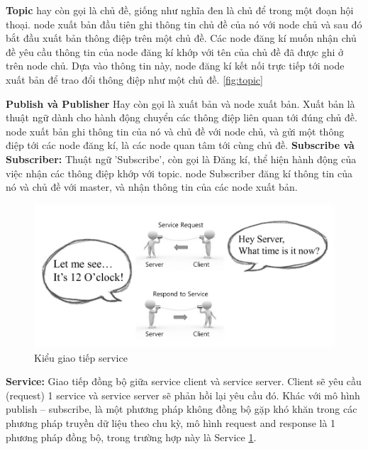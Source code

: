 \textbf{Topic} hay còn gọi là chủ đề, giống như nghĩa đen là chủ để trong một đoạn hội thoại. node xuất bản đầu tiên ghi thông tin chủ đề của nó với node chủ và sau đó bắt đầu xuất bản thông điệp trên một chủ đề. Các node đăng kí muốn nhận chủ đề yêu cầu thông tin của node đăng kí khớp với tên của chủ đề đã được ghi ở trên node chủ. Dựa vào thông tin này, node đăng kí kết nối trực tiếp tới node xuất bản để trao đổi thông điệp như một chủ đề. \figurename{\ref{fig:topic}}

\textbf{Publish và Publisher} Hay còn gọi là xuất bản và node xuất bản. Xuất bản là thuật ngữ dành cho hành động chuyển các thông điệp liên quan tới đúng chủ đề. node xuất bản ghi thông tin của nó và chủ đề với node chủ, và gửi một thông điệp tới các node đăng kí, là các node quan tâm tới cùng chủ đề.
\textbf{Subscribe và Subscriber:} Thuật ngữ 'Subscribe', còn gọi là Đăng kí, thể hiện hành động của việc nhận các thông điệp khớp với topic. node Subscriber đăng kí thông tin của nó và chủ đề với master, và nhận thông tin của các node xuất bản.

\begin{figure}[htbp]
  \centering
  \includegraphics[width=0.9\linewidth]{figures/service.png}
  \caption{Kiểu giao tiếp service}
  \label{fig:service}
\end{figure}
\textbf{Service: } Giao tiếp đồng bộ giữa service client và service server. Client sẽ yêu cầu (request) 1 service và service server sẽ phản hồi lại yêu cầu đó. Khác với mô hình publish – subscribe, là một phương pháp không đồng bộ gặp khó khăn trong các phương pháp truyền dữ liệu theo chu kỳ, mô hình request and response là 1 phương pháp đồng bộ, trong trường hợp này là Service \figurename{\ref{fig:service}}.

